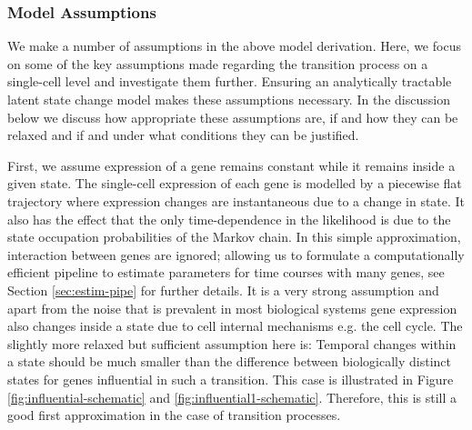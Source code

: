 \subsubsection{Model Assumptions}
\label{sec:model-assumptions}

We make a number of assumptions in the above model derivation. Here, we focus on some of the key assumptions made regarding the transition process on a single-cell level and investigate them further. Ensuring an analytically tractable latent state change model makes these assumptions necessary. In the discussion below we discuss how appropriate these assumptions are, if and how they can be relaxed and if and under what conditions they can be justified.

First, we assume expression of a gene remains constant while it remains inside a given state. The single-cell expression of each gene is modelled by a piecewise flat trajectory where expression changes are instantaneous due to a change in state. It also has the effect that the only time-dependence in the likelihood is due to the state occupation probabilities of the Markov chain. In this simple approximation, interaction between genes are ignored; allowing us to formulate a computationally efficient pipeline to estimate parameters for time courses with many genes, see Section \ref{sec:estim-pipe} for further details. It is a very strong assumption and apart from the noise that is prevalent in most biological systems gene expression also changes inside a state due to cell internal mechanisms e.g. the cell cycle. The slightly more relaxed but sufficient assumption here is: Temporal changes within a state should be much smaller than the difference between biologically distinct states for genes influential in such a transition. This case is illustrated in Figure \ref{fig:influential-schematic} and \ref{fig:influential1-schematic}. Therefore, this is still a good first approximation in the case of transition processes.

